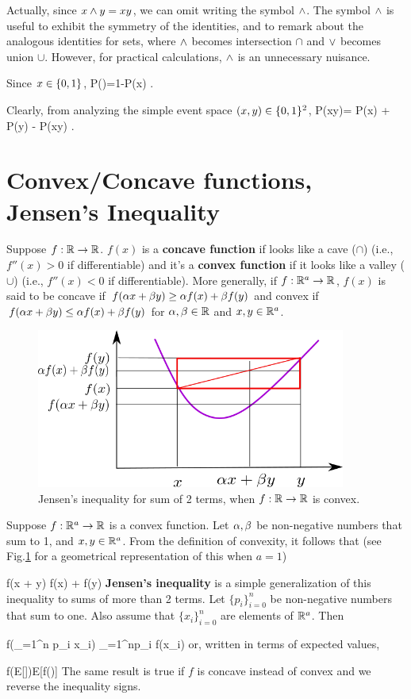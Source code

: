 Actually, since
$x\wedge y=xy$, we can omit writing
the symbol $\wedge$. The symbol
$\wedge$ is useful to
exhibit the symmetry
of the identities, and
to remark
about
the analogous identities
for sets, where
$\wedge$ becomes intersection $\cap$
and $\vee$ becomes union $\cup$. However,
for practical calculations,
$\wedge$ is an unnecessary nuisance.

Since $x\in \{0,1\}$,
\beq
P()=1-P(x)
\;.
\eeq

Clearly, from analyzing
the simple event space $(x,y)\in \{0,1\}^2$,
\beq
P(x\V y)= P(x) + P(y) - P(x\A y)
\;.
\eeq

\section{Convex/Concave functions,
Jensen's Inequality}
\label{sec0-jensens}
Suppose $f:{ \mathbb{R}}\rightarrow { \mathbb{R}}$.
$f(x)$ is
a  {\bf concave function} 
if
looks 
like a cave ($\cap$) (i.e., $f''(x)>0$
if differentiable)
and it's a {\bf convex function} if it
looks like a valley ($\cup$)
(i.e., $f''(x)<0$
if differentiable).
More generally, if $f:{ \mathbb{R}}^a\rightarrow { \mathbb{R}}$,
$f(x)$ is said
to be concave
if $f(\alpha x+\beta y)\geq \alpha f(x)
+\beta f(y)$ 
and convex
if
$f(\alpha x+\beta y)\leq \alpha f(x)
+\beta f(y)$
for $\alpha, \beta\in{ \mathbb{R}}$ and $x,y\in{ \mathbb{R}}^a$.

\begin{figure}[h!]
\centering
\includegraphics[width=4in]
{conventions/jensens.png}
\caption{Jensen's
inequality for sum of 2 terms, when
$f:{ \mathbb{R}}\rightarrow{ \mathbb{R}}$ is 
convex.}
\label{fig-jensens}
\end{figure}

Suppose $f:{ \mathbb{R}}^a\rightarrow { \mathbb{R}}$
is a convex function. Let 
 $\alpha,\beta$ be non-negative
 numbers that sum to 1,
 and $x,y\in { \mathbb{R}}^a$.
From the definition of convexity,
 it follows that
(see Fig.\ref{fig-jensens}
for a geometrical 
representation of this
when $a=1$)


\beq
f(\alp x + \beta y) \leq \alp f(x) 
+ \beta f(y)
\eeq
{\bf Jensen's inequality} is
a simple generalization of this 
inequality 
to sums of more than 2 terms.
Let $\{p_i\}_{i=0}^n$ be 
non-negative numbers that sum to one.
Also assume that
 $\{x_i\}_{i=0}^n$ are  elements of ${ \mathbb{R}}^a$.
Then

\beq
f\left(\sum_{=1}^n p_i x_i\right)
\leq 
\sum_{=1}^np_i f(x_i)
\eeq
or, written in terms 
of expected values,

\beq 
f(E[\rvx])\leq E[f(\rvx)]
\eeq
The same result is true
if $f$ is concave
instead of convex and
we reverse the inequality
signs.


